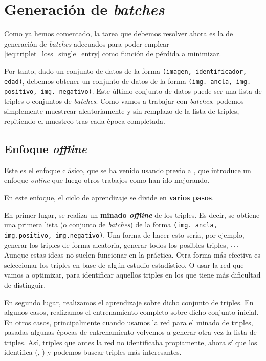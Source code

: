 \section{Generación de \textit{batches}} \label{isec:batching}

Como ya hemos comentado, la tarea que debemos resolver ahora es la de generación de \textit{batches} adecuados para poder emplear \eqref{ieq:triplet_loss_single_entry} como función de pérdida a minimizar.

Por tanto, dado un conjunto de datos de la forma \lstinline{(imagen, identificador, edad)}, debemos obtener un conjunto de datos de la forma \lstinline{(img. ancla, img. positivo, img. negativo)}. Este último conjunto de datos puede ser una lista de triples o conjuntos de \textit{batches}. Como vamos a trabajar con \textit{batches}, podemos simplemente muestrear aleatoriamente y sin remplazo de la lista de triples, repitiendo el muestreo tras cada época completada.

\subsection{Enfoque \textit{offline}} \label{isubs:enfoque_offline_minado_triples}

Este es el enfoque clásico, que se ha venido usando previo a \cite{informatica:facenet}, que introduce un enfoque \textit{online} que luego otros trabajos como \cite{informatica:principal} han ido mejorando.

En este enfoque, el ciclo de aprendizaje se divide en \textbf{varios pasos}.

En primer lugar, se realiza un \textbf{minado \textit{offline}} de los triples. Es decir, se obtiene una primera lista (o conjunto de \textit{batches}) de la forma \lstinline{(img. ancla, img.positivo, img.negativo)}. Una forma de hacer esto sería, por ejemplo, generar los triples de forma aleatoria, generar todos los posibles triples, $\ldots\ \ $ Aunque estas ideas no suelen funcionar en la práctica. Otra forma más efectiva es seleccionar los triples en base de algún estudio estadístico. O usar la red que vamos a optimizar, para identificar aquellos triples en los que tiene más dificultad de distinguir.

En segundo lugar, realizamos el aprendizaje sobre dicho conjunto de triples. En algunos casos, realizamos el entrenamiento completo sobre dicho conjunto inicial. En otros casos, principalmente cuando usamos la red para el minado de triples, pasadas algunas épocas de entrenamiento volvemos a generar otra vez la lista de triples. Así, triples que antes la red no identificaba propiamente, ahora sí que los identifica (, \cite{informatica:facenet}) y podemos buscar triples más interesantes.

